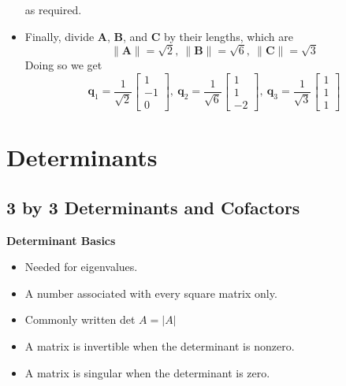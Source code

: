 \documentclass[11pt]{article}
\begin{document}
\begin{itemize}
    as required.
    \item Finally, divide $\boldsymbol{A}$, $\boldsymbol{B}$, and $\boldsymbol{C}$ by their 
    lengths, which are 
    \[ \|\boldsymbol{A}\| = \sqrt{2}, \ \|\boldsymbol{B}\| = \sqrt{6}, \ \|\boldsymbol{C}\| = 
    \sqrt{3}\]
    Doing so we get 
    \[\boldsymbol{q}_1 = \frac{1}{\sqrt{2}}\begin{bmatrix} 1 \\ -1 \\ 0 \end{bmatrix}, \ 
    \boldsymbol{q}_2 = \frac{1}{\sqrt{6}}\begin{bmatrix} 1 \\ 1 \\ -2 \end{bmatrix}, \
    \boldsymbol{q}_3 = \frac{1}{\sqrt{3}}\begin{bmatrix} 1 \\ 1 \\ 1 \end{bmatrix}\]
\end{itemize}

\section{Determinants}

\subsection{3 by 3 Determinants and Cofactors}

\textbf{Determinant Basics}
\begin{itemize}
    \item Needed for eigenvalues.
    \item A number associated with every square matrix only.
    \item Commonly written det $A=|A|$ 
    \item A matrix is invertible when the determinant is nonzero.
    \item A matrix is singular when the determinant is zero. 
\end{itemize}
\end{document}
